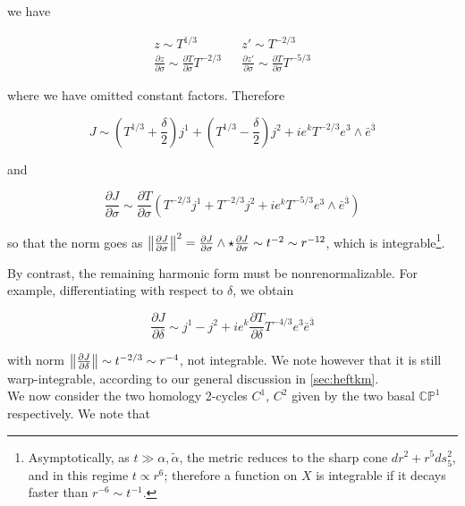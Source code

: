 we have

\begin{align}
	z \sim T^{1/3} && z' \sim T^{-2/3}\\	
	\frac{\partial z}{\partial \sigma} \sim \frac{\partial T}{\partial \sigma} T^{-2/3} && \frac{\partial z'}{\partial \sigma} \sim \frac{\partial T}{\partial \sigma} T^{-5/3}
\end{align}

where we have omitted constant factors. Therefore

\begin{equation}
	J \sim \left(T^{1/3} + \frac{\delta}{2}\right) j^1 + \left(T^{1/3} - \frac{\delta}{2}\right)j^2 + ie^k T^{-2/3} e^3 \wedge \bar e^{\bar 3}
	\label{}
\end{equation}

and

\begin{equation}
	\frac{\partial J}{\partial \sigma} \sim \frac{\partial T}{\partial \sigma}\left( T^{-2/3} j^1 + T^{-2/3} j^2 + i e^k T^{-5/3}e^3 \wedge \bar e^{\bar 3} \right)
	\label{}
\end{equation}


so that the norm goes as $\left\Vert \frac{\partial J}{\partial\sigma} \right\Vert^2 = \frac{\partial J}{\partial\sigma} \wedge \star \frac{\partial J}{\partial\sigma} \sim t^{-2} \sim r^{-12}$, which is integrable\footnote{Asymptotically, as $t\gg \alpha,\tilde{\alpha}$, the metric reduces to the sharp cone $dr^2 + r^5 ds_5^2$, and in this regime $t \propto r^6$; therefore a function on $X$ is integrable if it decays faster than $r^{-6} \sim t^{-1}$.}.

By contrast, the remaining harmonic form must be nonrenormalizable. For example, differentiating with respect to $\delta$, we obtain

\begin{equation}
	\frac{\partial J}{\partial \delta} \sim j^1 - j^2 + ie^k \frac{\partial T}{\partial \delta} T^{-4/3} e^3 \bar e^{\bar 3}
	\label{}
\end{equation}

with norm $ \left\Vert \frac{\partial J}{\partial\delta} \right\Vert \sim t^{-2/3} \sim r^{-4}$, not integrable. We note however that it is still warp-integrable, according to our general discussion in \ref{sec:heftkm}.\\

We now consider the two homology 2-cycles $C^1$, $C^2$ given by the two basal $\mathbb{CP}^1$ respectively. We note that

